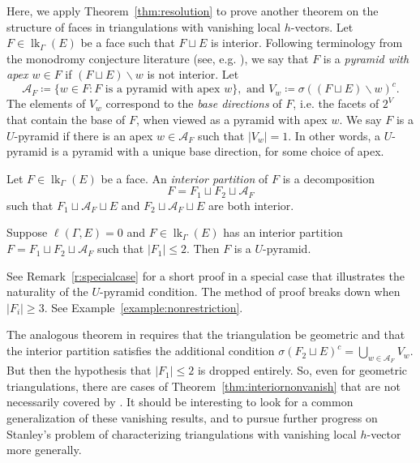\documentclass[ALCO, Unicode,published]{cedram}
\DeclareMathOperator{\lk}{lk}
\begin{document}
Here, we apply  Theorem~\ref{thm:resolution} to prove another theorem on the structure of faces in triangulations with vanishing local $h$-vectors.  Let $F \in \lk_\Gamma(E)$ be a face such that $F\sqcup E$ is interior. Following terminology from the monodromy conjecture literature (see, e.g. \cite{LemahieuVanProeyen11}), we say that $F$ is a \emph{pyramid with apex $w \in F$}  if $(F \sqcup E )  \smallsetminus w$ is not interior. Let $$\mathcal{A}_F  \coloneqq  \{ w \in F : F \mbox{ is a pyramid with apex } w \}, \mbox{ \ and \ } V_w  \coloneqq  \sigma( (F \sqcup E) \smallsetminus w)^c.$$
The elements of $V_w$ correspond to the \emph{base directions} of $F$, i.e. the facets of $2^V$ that contain the base of $F$, when viewed as a pyramid with apex $w$.  We say $F$ is a $U$-pyramid if there is an apex $w \in \mathcal{A}_F$ such that $|V_w|  = 1$. In other words, a $U$-pyramid is a pyramid with a unique base direction, for some choice of apex.

\begin{definition}
Let $F \in \lk_{\Gamma}(E)$ be a face.  An \emph{interior partition} of $F$ is a decomposition
\[
F = F_1 \sqcup F_2 \sqcup \mathcal{A}_F
\]
such that $F_1 \sqcup \mathcal{A}_F \sqcup E$ and $F_2 \sqcup \mathcal{A}_F \sqcup E$ are both interior.
\end{definition}

\begin{theorem}\label{thm:interiornonvanish}
Suppose $\ell(\Gamma,E) = 0$ and $F \in \lk_\Gamma(E)$ has an interior partition $F = F_1 \sqcup F_2 \sqcup \mathcal{A}_F$ such that $|F_1| \leq 2$.  Then $F$ is a $U$-pyramid.
\end{theorem}

See Remark~\ref{r:specialcase} for a short proof in a special case that illustrates the naturality of the 
$U$-pyramid condition.
The method of proof breaks down when $|F_i| \geq 3$.  See Example~\ref{example:nonrestriction}.  


\begin{remark}
The analogous theorem in \cite{LarsonPayneStapledon} requires that the triangulation be geometric and that the interior partition satisfies the additional condition $\sigma(F_2 \sqcup E)^c = \bigcup_{w \in \mathcal{A}_F} V_w$.  But then the hypothesis that $|F_1| \leq 2$ is dropped entirely.  So, even for geometric triangulations, there are cases of Theorem~\ref{thm:interiornonvanish} that are not necessarily covered by \cite[Theorem~4.1.3]{LarsonPayneStapledon}. It should be interesting to look for a common generalization of these vanishing results, and to pursue further progress on Stanley's problem of characterizing triangulations with vanishing local $h$-vector more generally.
\end{remark}
\end{document}

